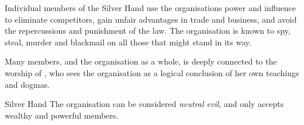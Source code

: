 Individual members of the Silver Hand use the organisations power and
influence to eliminate competitors, gain unfair advantages in trade and
business, and avoid the repercussions and punishment of the law. The
organisation is known to spy, steal, murder and blackmail on all those
that might stand in its way.

Many members, and the organisation as a whole, is deeply connected to the
worship of , who sees the organisation as a logical
conclusion of her own teachings and dogmas.

\begin{35e}{Silver Hand}
  The organisation can be considered \emph{neutral evil}, and only accepts
  wealthy and powerful members.
\end{35e}
